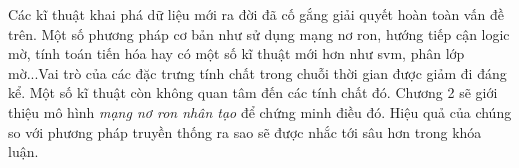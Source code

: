 Các kĩ thuật khai phá dữ liệu mới ra đời đã cố gắng giải quyết hoàn toàn vấn đề trên. Một số phương pháp cơ bản như sử dụng mạng nơ ron, hướng tiếp cận logic mờ, tính toán tiến hóa hay có một số kĩ thuật mới hơn như svm, phân lớp mờ...Vai trò của các đặc trưng tính chất trong chuỗi thời gian được giảm đi đáng kể. Một số kĩ thuật còn không quan tâm đến các tính chất đó. Chương 2 sẽ giới thiệu mô hình \textit{mạng nơ ron nhân tạo} để chứng minh điều đó. Hiệu quả của chúng so với phương pháp truyền thống ra sao sẽ được nhắc tới sâu hơn trong khóa luận.
